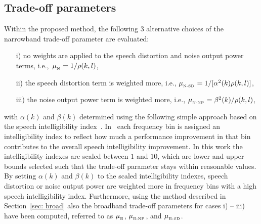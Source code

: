 \documentclass{article}
\begin{document}
\subsection{Trade-off parameters}
Within the proposed method, the following $3$ alternative choices of the narrowband trade-off parameter are evaluated:
\begin{itemize}
  \item[i)] no weights are applied to the speech distortion and noise output power terms, i.e.,~$\mu_{_{\rm N}} = 1/\rho(k,l)$,
  \item[ii)] the speech distortion term is weighted more, i.e., $\mu_{_{\rm N\text{-}SD}} = 1/[\alpha^2(k)\rho(k,l)]$,
  \item[iii)] the noise output power term is weighted more, i.e., $\mu_{_{\rm N\text{-}NP}} = \beta^2(k)/\rho(k,l)$,
\end{itemize}
with $\alpha(k)$ and $\beta(k)$ determined using the following simple approach based on the speech intelligibility index~\cite{ASA}.
In~\cite{ASA} each frequency bin is assigned an intelligibility index to reflect how much a performance improvement in that bin contributes to the overall speech intelligibility improvement.
In this work the intelligibility indexes are scaled between $1$ and $10$, which are lower and upper bounds selected such that the trade-off parameter stays within reasonable values.  
By setting $\alpha(k)$ and $\beta(k)$ to the scaled intelligibility indexes, speech distortion or noise output power are weighted more in frequency bins with a high speech intelligibility index.
Furthermore, using the method described in Section~\ref{sec: broad} also the broadband trade-off parameters for cases i) -- iii) have been computed, referred to as $\mu_{_{\rm B}}$, $\mu_{_{\rm B\text{-}NP}}$, and $\mu_{_{\rm B\text{-}SD}}$.
\end{document}
